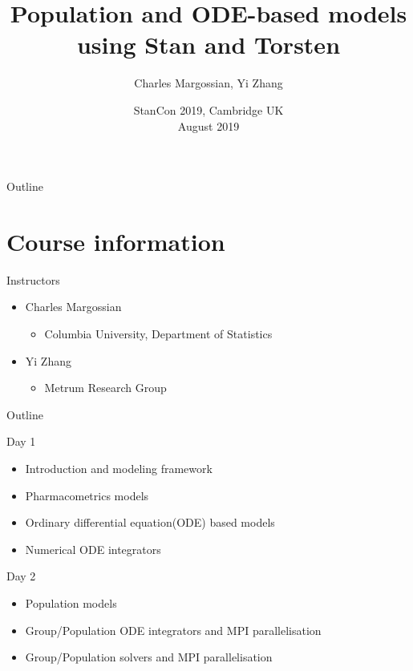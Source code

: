 \documentclass[presentation, allowframebreaks]{beamer}
\author{Charles Margossian, Yi Zhang}
\date{StanCon 2019, Cambridge UK \\ August 2019}
\title{Population and ODE-based models \\ using Stan and Torsten}
\begin{document}
\maketitle
\begin{frame}{Outline}
\setcounter{tocdepth}{1}
\tableofcontents
\end{frame}


\section{Course information}
\label{sec:orge75ebe8}
\begin{frame}[label={sec:org9a97511}]{}
\begin{block}{Instructors}
\begin{itemize}
\item Charles Margossian
\begin{itemize}
\item Columbia University, Department of Statistics
\end{itemize}
\item Yi Zhang
\begin{itemize}
\item Metrum Research Group
\end{itemize}
\end{itemize}
\end{block}
\end{frame}
\begin{frame}[label={sec:org08f9411}]{Outline}
\begin{block}{Day 1}
\begin{itemize}
\item Introduction and modeling framework
\item Pharmacometrics models
\item Ordinary differential equation(ODE) based models
\item Numerical ODE integrators
\end{itemize}
\end{block}
\begin{block}{Day 2}
\begin{itemize}
\item Population models
\item Group/Population ODE integrators and MPI parallelisation
\item Group/Population solvers and MPI parallelisation
\end{itemize}
\end{block}
\end{frame}
\end{document}
